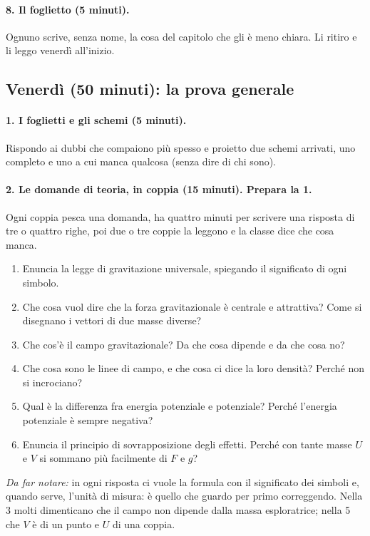 \documentclass[11pt]{report}
\begin{document}
\paragraph{8. Il foglietto (5 minuti).}
Ognuno scrive, senza nome, la cosa del capitolo che gli è meno chiara.
Li ritiro e li leggo venerdì all'inizio.

\subsection*{Venerdì (50 minuti): la prova generale}

\paragraph{1. I foglietti e gli schemi (5 minuti).}
Rispondo ai dubbi che compaiono più spesso e proietto due schemi arrivati,
uno completo e uno a cui manca qualcosa (senza dire di chi sono).

\paragraph{2. Le domande di teoria, in coppia (15 minuti). Prepara la 1.}
Ogni coppia pesca una domanda, ha quattro minuti per scrivere una risposta
di tre o quattro righe, poi due o tre coppie la leggono e la classe dice che
cosa manca.
\begin{enumerate}
  \item Enuncia la legge di gravitazione universale, spiegando il
  significato di ogni simbolo.
  \item Che cosa vuol dire che la forza gravitazionale è centrale e
  attrattiva? Come si disegnano i vettori di due masse diverse?
  \item Che cos'è il campo gravitazionale? Da che cosa dipende e da che cosa
  no?
  \item Che cosa sono le linee di campo, e che cosa ci dice la loro densità?
  Perché non si incrociano?
  \item Qual è la differenza fra energia potenziale e potenziale? Perché
  l'energia potenziale è sempre negativa?
  \item Enuncia il principio di sovrapposizione degli effetti. Perché con
  tante masse $U$ e $V$ si sommano più facilmente di $F$ e $g$?
\end{enumerate}

\emph{Da far notare:} in ogni risposta ci vuole la formula con il
significato dei simboli e, quando serve, l'unità di misura: è quello che
guardo per primo correggendo. Nella 3 molti dimenticano che il campo non
dipende dalla massa esploratrice; nella 5 che $V$ è di un punto e $U$ di una
coppia.
\end{document}
